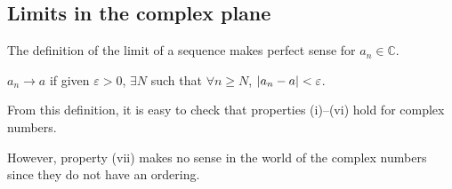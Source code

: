\subsection{Limits in the complex plane}
\begin{remark}
	The definition of the limit of a sequence makes perfect sense for \(a_n \in \mathbb C\).
\end{remark}
\begin{definition}
	\(a_n \to a\) if given \(\varepsilon > 0\), \(\exists N\) such that \(\forall n \geq N\), \(\abs{a_n - a} < \varepsilon\).
\end{definition}
From this definition, it is easy to check that properties (i)--(vi) hold for complex numbers.

However, property (vii) makes no sense in the world of the complex numbers since they do not have an ordering.

